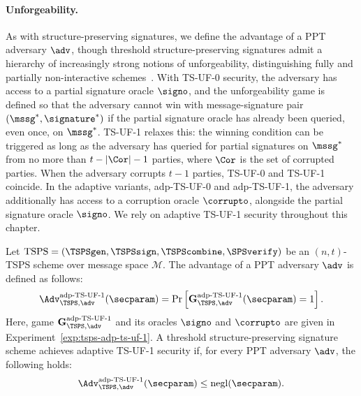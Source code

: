 \paragraph{Unforgeability.} As with structure-preserving signatures, we define
the advantage of a PPT adversary $\adv$, though threshold structure-preserving
signatures admit a hierarchy of increasingly strong notions of unforgeability,
distinguishing fully and partially non-interactive schemes~\cite{C:BCKMTZ22}.
With TS-UF-0 security, the adversary has access to a partial signature oracle
$\signo$, and the unforgeability game is defined so that the adversary cannot
win with message-signature pair $(\mssg^*, \signature^*)$ if the partial
signature oracle has already been queried, even once, on $\mssg^*$.  TS-UF-1
relaxes this: the winning condition can be triggered as long as the adversary
has queried for partial signatures on $\mssg^*$ from no more than $t - |\Cor| -
1$ parties, where $\Cor$ is the set of corrupted parties.  When the adversary
corrupts $t-1$ parties, TS-UF-0 and TS-UF-1 coincide. In the adaptive variants,
adp-TS-UF-0 and adp-TS-UF-1, the adversary additionally has access to a
corruption oracle $\corrupto$, alongside the partial signature oracle $\signo$.
We rely on adaptive TS-UF-1 security throughout this chapter.

Let $\mathrm{TSPS} = (\TSPSgen, \TSPSsign, \TSPScombine, \SPSverify)$ be an
$(n, t)$-TSPS scheme over message space $\mathcal{M}$. The advantage of a PPT
adversary $\adv$ is defined as follows:
%
\begin{equation*}
%
  \Adv_{\TSPS, \adv}^{\text{adp-TS-UF-1}}(\secparam) = \Pr\left\lbrack
  \mathbf{G}_{\TSPS, \adv}^{\text{adp-TS-UF-1}}(\secparam) = 1 \right\rbrack .
%
\end{equation*}
%
Here, game $\mathbf{G}_{\TSPS, \adv}^{\text{adp-TS-UF-1}}$ and its oracles
$\signo$ and $\corrupto$ are given in Experiment~\ref{exp:tsps-adp-ts-uf-1}. A
threshold structure-preserving signature scheme achieves adaptive TS-UF-1
security if, for every PPT adversary $\adv$, the following holds:
%
\begin{equation*}
%
  \Adv_{\TSPS, \adv}^{\text{adp-TS-UF-1}}(\secparam) \leq
  \operatorname{negl}(\secparam).
%
\end{equation*}

